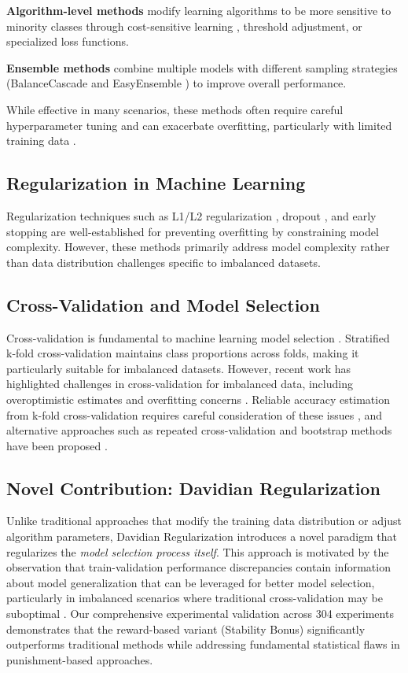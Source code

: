 \documentclass[11pt,twocolumn]{article}
\begin{document}
\textbf{Algorithm-level methods} modify learning algorithms to be more sensitive to minority classes through cost-sensitive learning \cite{elkan2001foundations}, threshold adjustment, or specialized loss functions.

\textbf{Ensemble methods} combine multiple models with different sampling strategies (BalanceCascade and EasyEnsemble \cite{liu2009exploratory}) to improve overall performance.

While effective in many scenarios, these methods often require careful hyperparameter tuning and can exacerbate overfitting, particularly with limited training data \cite{garcia2012effectiveness}.

\subsection{Regularization in Machine Learning}
Regularization techniques such as L1/L2 regularization \cite{tibshirani1996regression}, dropout \cite{srivastava2014dropout}, and early stopping are well-established for preventing overfitting by constraining model complexity. However, these methods primarily address model complexity rather than data distribution challenges specific to imbalanced datasets.

\subsection{Cross-Validation and Model Selection}
Cross-validation is fundamental to machine learning model selection \cite{stone1974cross,arlot2010survey}. Stratified k-fold cross-validation \cite{kohavi1995study} maintains class proportions across folds, making it particularly suitable for imbalanced datasets. However, recent work has highlighted challenges in cross-validation for imbalanced data, including overoptimistic estimates and overfitting concerns \cite{santos2018cross}. Reliable accuracy estimation from k-fold cross-validation requires careful consideration of these issues \cite{wong2019reliable}, and alternative approaches such as repeated cross-validation and bootstrap methods have been proposed \cite{kim2009estimating}.

\subsection{Novel Contribution: Davidian Regularization}
Unlike traditional approaches that modify the training data distribution or adjust algorithm parameters, Davidian Regularization introduces a novel paradigm that regularizes the \textit{model selection process itself}. This approach is motivated by the observation that train-validation performance discrepancies contain information about model generalization that can be leveraged for better model selection, particularly in imbalanced scenarios where traditional cross-validation may be suboptimal \cite{santos2018cross}. Our comprehensive experimental validation across 304 experiments demonstrates that the reward-based variant (Stability Bonus) significantly outperforms traditional methods while addressing fundamental statistical flaws in punishment-based approaches.
\end{document}
